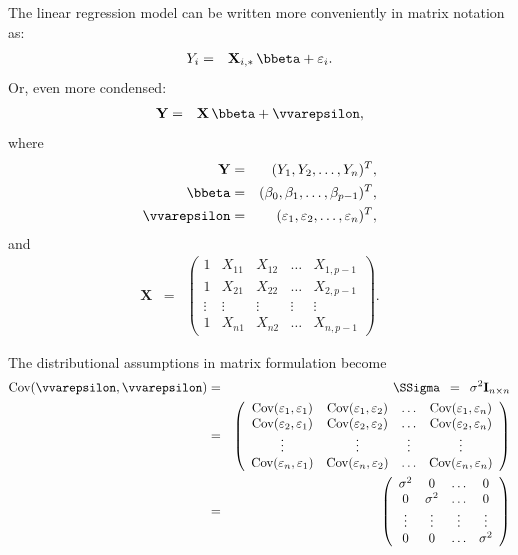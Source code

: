 \documentclass[a4paper]{article}
\theoremstyle{myexamplestyle}
\begin{document}
The linear regression model can be written more conveniently in matrix notation as:
\begin{eqnarray*}
Y_{i} & = & \mathbf{X}_{i,\ast} \, \bbeta + \varepsilon_i.
\end{eqnarray*}
Or, even more condensed:
\begin{eqnarray*}
\mathbf{Y} & = & \mathbf{X} \, \bbeta + \vvarepsilon,
\end{eqnarray*}
where
\begin{eqnarray*}
\mathbf{Y} & = &  (Y_1, Y_2, \ldots, Y_n)^T,
\\
\bbeta & = & (\beta_0, \beta_1, \ldots, \beta_{p-1})^T,
\\
\vvarepsilon & = &  (\varepsilon_1, \varepsilon_2, \ldots, \varepsilon_n)^T,
\end{eqnarray*}
and
\begin{eqnarray*}
\mathbf{X} & = & \left(
\begin{array}{ccccc}
1 & X_{11} & X_{12} & \ldots & X_{1,p-1}
\\
1 & X_{21} & X_{22} & \ldots & X_{2,p-1}
\\
\vdots & \vdots & \vdots & \vdots & \vdots
\\
1 & X_{n1} & X_{n2} & \ldots & X_{n,p-1}
\end{array} \right).
\end{eqnarray*}


The distributional assumptions in matrix formulation become
\begin{eqnarray*}
\mbox{Cov}(\vvarepsilon, \vvarepsilon) & = & \SSigma \, \, \, = \, \, \, \sigma^2 \mathbf{I}_{n \times n}
\\
& = & \left(
\begin{array}{cccc}
\mbox{Cov}(\varepsilon_1, \varepsilon_1) & \mbox{Cov}(\varepsilon_1, \varepsilon_2) & \ldots & \mbox{Cov}(\varepsilon_1, \varepsilon_n)
\\
\mbox{Cov}(\varepsilon_2, \varepsilon_1) & \mbox{Cov}(\varepsilon_2, \varepsilon_2) & \ldots & \mbox{Cov}(\varepsilon_2, \varepsilon_n)
\\
\vdots & \vdots & \vdots & \vdots
\\
\mbox{Cov}(\varepsilon_n, \varepsilon_1) & \mbox{Cov}(\varepsilon_n, \varepsilon_2) & \ldots & \mbox{Cov}(\varepsilon_n, \varepsilon_n)
\end{array} \right)
\\
& = & \left(
\begin{array}{cccc}
\sigma^2 & 0 & \ldots & 0
\\
0 & \sigma^2 & \ldots & 0
\\
\vdots & \vdots & \vdots & \vdots
\\
0 & 0 & \ldots & \sigma^2
\end{array} \right)
\end{eqnarray*}
\end{document}
